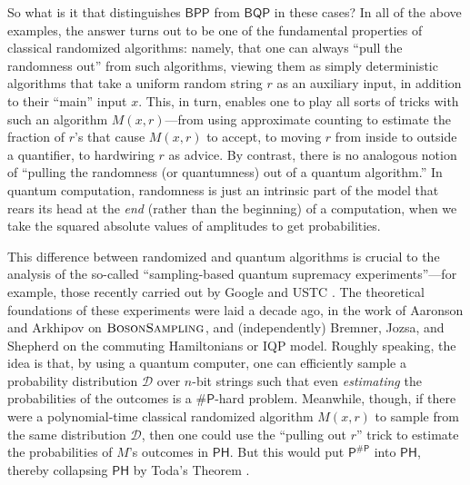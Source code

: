 \documentclass[10pt,a4paper]{article}
\begin{document}
So what is it that distinguishes $\mathsf{BPP}$ from $\mathsf{BQP}$ in these cases?  In all of the above examples, the answer turns out to be one of the fundamental properties of classical randomized algorithms: namely, that one can always ``pull the randomness out'' from such algorithms, viewing them as simply deterministic algorithms that take a uniform random string $r$ as an auxiliary input, in addition to their ``main'' input $x$.  This, in turn, enables one to play all sorts of tricks with such an algorithm $M(x,r)$---from using approximate counting to estimate the fraction of $r$'s that cause $M(x,r)$ to accept, to moving $r$ from inside to outside a quantifier, to hardwiring $r$ as advice.  By contrast, there is no analogous notion of ``pulling the randomness (or quantumness) out of a quantum algorithm.''  In quantum computation, randomness is just an intrinsic part of the model that rears its head at the \textit{end} (rather than the beginning) of a computation, when we take the squared absolute values of amplitudes to get probabilities.

This difference between randomized and quantum algorithms is crucial to the analysis of the so-called ``sampling-based quantum supremacy experiments''---for example, those recently carried out by Google \cite{AAB+19} and USTC \cite{ZWD+20}.  The theoretical foundations of these experiments were laid a decade ago, in the work of Aaronson and Arkhipov \cite{AA13} on $\textsc{BosonSampling}$, and (independently) Bremner, Jozsa, and Shepherd \cite{BJS10} on the commuting Hamiltonians or IQP model. Roughly speaking, the idea is that, by using a quantum computer, one can efficiently sample a probability distribution $\mathcal{D}$ over $n$-bit strings such that even \textit{estimating} the probabilities of the outcomes is a $\mathsf{\# P}$-hard problem.  Meanwhile, though, if there were a polynomial-time classical randomized algorithm $M(x,r)$ to sample from the same distribution $\mathcal{D}$, then one could use the ``pulling out $r$'' trick to estimate the probabilities of $M$'s outcomes in $\mathsf{PH}$.  But this would put $\mathsf{P}^\mathsf{\# P}$ into $\mathsf{PH}$, thereby collapsing $\mathsf{PH}$ by Toda's Theorem \cite{Tod91}.
\end{document}
